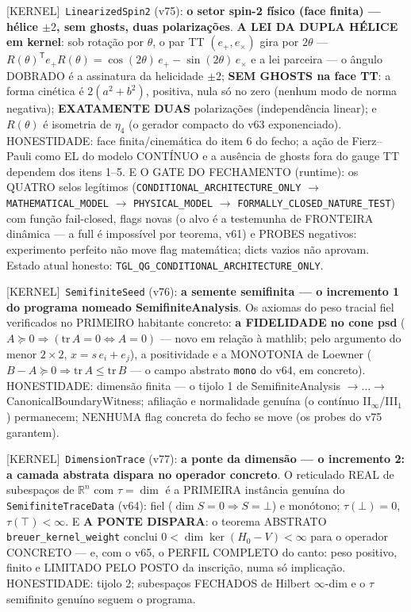\documentclass[11pt]{article}
\providecommand{\kernelmk}[1]{\textsf{[KERNEL]}~\texttt{#1}}\providecommand{\knownmk}[1]{\textsf{[KNOWN]}~{#1}}\providecommand{\statusmk}[1]{\textsf{[#1]}}
\theoremstyle{definition}\newtheorem{deriv}{Derivação}
\begin{document}
\kernelmk{LinearizedSpin2} (v75): \textbf{o setor spin-2 físico (face finita) --- hélice $\pm2$, sem ghosts, duas polarizações}. \textbf{A LEI DA DUPLA HÉLICE em kernel}: sob rotação por $\theta$, o par TT $(e_+,e_\times)$ gira por $2\theta$ --- $R(\theta)^{\mathsf T}e_+R(\theta)=\cos(2\theta)\,e_+-\sin(2\theta)\,e_\times$ e a lei parceira --- o ângulo DOBRADO é a assinatura da helicidade $\pm2$; \textbf{SEM GHOSTS na face TT}: a forma cinética é $2(a^2+b^2)$, positiva, nula só no zero (nenhum modo de norma negativa); \textbf{EXATAMENTE DUAS} polarizações (independência linear); e $R(\theta)$ é isometria de $\eta_4$ (o gerador compacto do v63 exponenciado). HONESTIDADE: face finita/cinemática do item 6 do fecho; a ação de Fierz--Pauli como EL do modelo CONTÍNUO e a ausência de ghosts fora do gauge TT dependem dos itens 1--5. E O GATE DO FECHAMENTO (runtime): os QUATRO selos legítimos (\texttt{CONDITIONAL\_ARCHITECTURE\_ONLY} $\to$ \texttt{MATHEMATICAL\_MODEL} $\to$ \texttt{PHYSICAL\_MODEL} $\to$ \texttt{FORMALLY\_CLOSED\_NATURE\_TEST}) com função fail-closed, flags novas (o alvo é a testemunha de FRONTEIRA dinâmica --- a full é impossível por teorema, v61) e PROBES negativos: experimento perfeito não move flag matemática; dicts vazios não aprovam. Estado atual honesto: \texttt{TGL\_QG\_CONDITIONAL\_ARCHITECTURE\_ONLY}.

\kernelmk{SemifiniteSeed} (v76): \textbf{a semente semifinita --- o incremento 1 do programa nomeado SemifiniteAnalysis}. Os axiomas do peso tracial fiel verificados no PRIMEIRO habitante concreto: \textbf{a FIDELIDADE no cone psd} ($A\succeq0\Rightarrow(\mathrm{tr}\,A=0\Leftrightarrow A=0)$ --- novo em relação à mathlib; pelo argumento do menor $2\times2$, $x=s\,e_i+e_j$), a positividade e a MONOTONIA de Loewner ($B-A\succeq0\Rightarrow\mathrm{tr}\,A\le\mathrm{tr}\,B$ --- o campo abstrato \texttt{mono} do v64, em concreto). HONESTIDADE: dimensão finita --- o tijolo 1 de SemifiniteAnalysis $\to\dots\to$ CanonicalBoundaryWitness; afiliação e normalidade genuína (o contínuo II$_\infty$/III$_1$) permanecem; NENHUMA flag concreta do fecho se move (os probes do v75 garantem).

\kernelmk{DimensionTrace} (v77): \textbf{a ponte da dimensão --- o incremento 2: a camada abstrata dispara no operador concreto}. O reticulado REAL de subespaços de $\mathbb R^n$ com $\tau=\dim$ é a PRIMEIRA instância genuína do \texttt{SemifiniteTraceData} (v64): fiel ($\dim S=0\Rightarrow S=\bot$) e monótono; $\tau(\bot)=0$, $\tau(\top)<\infty$. E \textbf{A PONTE DISPARA}: o teorema ABSTRATO \texttt{breuer\_kernel\_weight} conclui $0<\dim\ker(H_0-V)<\infty$ para o operador CONCRETO --- e, com o v65, o PERFIL COMPLETO do canto: peso positivo, finito e LIMITADO PELO POSTO da inscrição, numa só implicação. HONESTIDADE: tijolo 2; subespaços FECHADOS de Hilbert $\infty$-dim e o $\tau$ semifinito genuíno seguem o programa.
\end{document}
